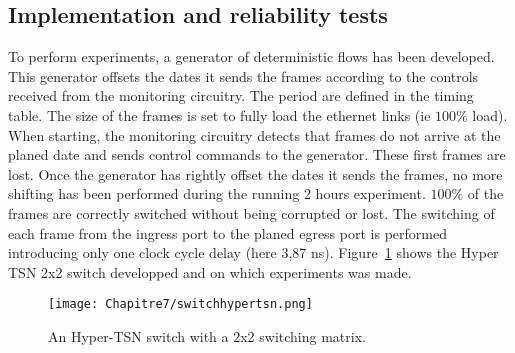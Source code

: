 \subsection{Implementation and reliability tests}

To perform experiments, a generator of deterministic flows has been developed. This generator offsets the dates it sends the frames according to the controls received from the monitoring circuitry. The period are defined in the timing table. The size of the frames is set to fully load the ethernet links (ie $100\%$ load).
When starting, the monitoring circuitry detects that frames do not arrive at the planed date and sends control commands to the generator. These first frames are lost. Once the generator has rightly offset the dates it sends the frames, no more shifting has been performed during the running 2 hours experiment. $100\%$ of the frames are correctly switched without being corrupted or lost. The switching of each frame from the ingress port to the planed egress port is performed introducing only one clock cycle delay (here 3,87 ns).
Figure~\ref{fig:hypertsnswitch} shows the Hyper TSN 2x2 switch developped and on which experiments was made.
\begin{center}

\begin{figure}[h]
  \centering
\texttt{[image: Chapitre7/switchhypertsn.png]}
\caption{ An Hyper-TSN switch with a 2x2 switching matrix.}
\label{fig:hypertsnswitch}
\end{figure}
\end{center}
